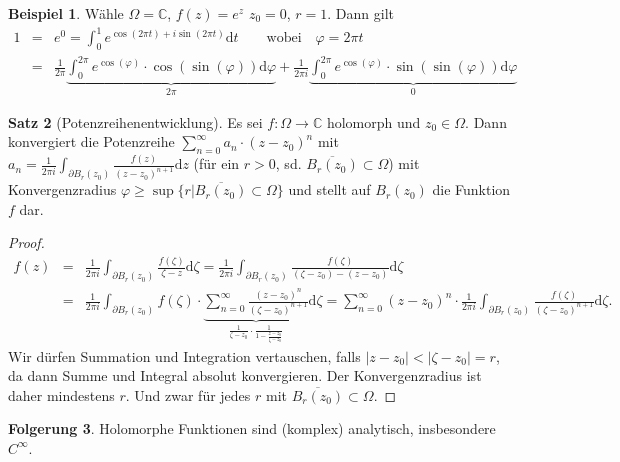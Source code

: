 \documentclass[11pt,titlepage]{article}
\theoremstyle{definition}
\newtheorem{theorem}{Satz}[section]
\newtheorem{corollary}[theorem]{Folgerung}
\newtheorem{example}[theorem]{Beispiel}
\theoremstyle{remark}
\begin{document}
	\begin{example}
		Wähle $\Omega=\mathbb{C}$, $f(z)=e^z$ $z_0 =0$, $r=1$. Dann gilt
		\begin{eqnarray*}
			1&=& e^0 = \int_0^1 e^{\cos(2\pi t)+i\sin (2\pi t)}\mathrm{d}t \qquad \text{wobei}\quad \varphi=2\pi t \\
			&=& \frac{1}{2\pi} \underbrace{\int_0^{2\pi} e^{\cos(\varphi)}\cdot \cos(\sin(\varphi)) 
			\mathrm{d}\varphi }_{2\pi} +\frac{1}{2\pi i} \underbrace{\int_0^{2\pi}e^{\cos(\varphi)}\cdot 
			\sin(\sin(\varphi))\mathrm{d}\varphi}_{0}
		\end{eqnarray*}
	\end{example}
	
	\begin{theorem}[Potenzreihenentwicklung]
		Es sei $f:\Omega\to\mathbb{C}$ holomorph und $z_0\in\Omega$. Dann konvergiert die 
		Potenzreihe $\sum_{n=0}^{\infty} a_n \cdot (z-z_0)^n$ mit $a_n = \frac{1}{2\pi i} \int_{\partial B_r 
		(z_0)} \frac{f(z)}{(z-z_0)^{n+1}}\mathrm{d}z$ (für ein $r>0$, sd. $\overline{B_r (z_0)}
		\subset\Omega$) mit Konvergenzradius $\varphi \geq \sup\{r|\overline{B_r (z_0)}
		\subset\Omega\}$ und stellt auf $B_r (z_0)$ die Funktion $f$ dar.
	\end{theorem}
	
	\begin{proof}
		\begin{eqnarray*}
			f(z) &=& \frac{1}{2\pi i} \int_{\partial B_r (z_0)} \frac{f(\zeta)}{\zeta -z}\mathrm{d}\zeta 
			= \frac{1}{2\pi i}\int_{\partial B_r (z_0)} \frac{f(\zeta)}{(\zeta - z_0)-(z-z_0)}\mathrm{d}\zeta \\
			&=& \frac{1}{2\pi i} \int_{\partial B_r (z_0)} f(\zeta)\cdot \underbrace{\sum_{n=0}^{\infty} 
			\frac{(z-z_0)^n}{(\zeta - z_0)^{n+1}}}_{\frac{1}{\zeta -z_0}\cdot\frac{1}{1-\frac{z-z_0}
			{\zeta -z_0}}}\mathrm{d}\zeta 
			= \sum_{n=0}^{\infty} (z-z_0)^n \cdot \frac{1}{2\pi i} \int_{\partial B_r (z_0)} 
			\frac{f(\zeta)}{(\zeta -z_0)^{n+1}} \mathrm{d}\zeta.
		\end{eqnarray*}
		Wir dürfen Summation und Integration vertauschen, falls $|z-z_0|<|\zeta -z_0|=r$, da dann 
		Summe und Integral absolut konvergieren. Der Konvergenzradius ist daher mindestens $r$. 
		Und zwar für jedes $r$ mit $\overline{B_r (z_0)}\subset\Omega$.
	\end{proof}
	
	\begin{corollary}\label{coroll:holo}
		Holomorphe Funktionen sind (komplex) analytisch, insbesondere $C^{\infty}$.
	\end{corollary}
	
\end{document}
